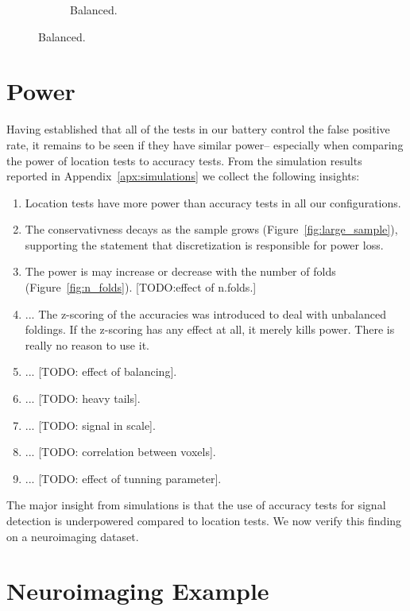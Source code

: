 \documentclass[12pt,a4paper]{article}
\begin{document}
\begin{figure}[h]
\begin{subfigure}{.5\textwidth}
\caption{Balanced.} %
\label{fig:simulation_12}
\end{subfigure}
\end{figure}




\section{Power}
\label{sec:power}

Having established that all of the tests in our battery control the false positive rate, it remains to be seen if they have similar power-- 
especially when comparing the power of location tests to accuracy tests. 
From the simulation results reported in Appendix~\ref{apx:simulations} we collect the following insights:
\begin{enumerate}
\item Location tests have more power than accuracy tests in all our configurations.
\item The conservativness decays as the sample grows (Figure~\ref{fig:large_sample}), supporting the statement that discretization is responsible for power loss. 
\item The power is may increase or decrease with the number of folds (Figure~\ref{fig:n_folds}). [TODO:effect of n.folds.]
\item ... The z-scoring of the accuracies was introduced to deal with unbalanced foldings. 
If the z-scoring has any effect at all, it merely kills power.
There is really no reason to use it. 
\item ... [TODO: effect of balancing].
\item ... [TODO: heavy tails].
\item ... [TODO: signal in scale].
\item ... [TODO: correlation between voxels].
\item ... [TODO: effect of tunning parameter].
\end{enumerate}


The major insight from simulations is that the use of accuracy tests for signal detection is underpowered compared to location tests. 
We now verify this finding on a neuroimaging dataset.



\section{Neuroimaging Example}
\label{sec:example}
\end{document}

